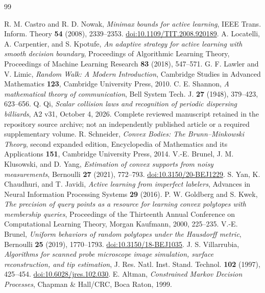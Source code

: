 \begin{thebibliography}{99}
\raggedright
{}
R. M. Castro and R. D. Nowak, \emph{Minimax bounds for active learning},
IEEE Trans. Inform. Theory \textbf{54} (2008), 2339--2353.
\href{https://doi.org/10.1109/TIT.2008.920189}{doi:10.1109/TIT.2008.920189}.
A. Locatelli, A. Carpentier, and S. Kpotufe,
\emph{An adaptive strategy for active learning with smooth decision boundary},
Proceedings of Algorithmic Learning Theory, Proceedings of Machine
Learning Research \textbf{83} (2018), 547--571.
G. F. Lawler and V. Limic, \emph{Random Walk: A Modern Introduction},
Cambridge Studies in Advanced Mathematics \textbf{123}, Cambridge
University Press, 2010.
C. E. Shannon, \emph{A mathematical theory of communication},
Bell System Tech. J. \textbf{27} (1948), 379--423, 623--656.
Q. Qi, \emph{Scalar collision laws and recognition of periodic dispersing
billiards}, A2 v31, October 4, 2026. Complete reviewed manuscript retained in the repository source archive;
not an independently published article or a required supplementary volume.
R. Schneider, \emph{Convex Bodies: The Brunn--Minkowski Theory},
second expanded edition, Encyclopedia of Mathematics and its Applications
\textbf{151}, Cambridge University Press, 2014.
V.-E. Brunel, J. M. Klusowski, and D. Yang,
\emph{Estimation of convex supports from noisy measurements},
Bernoulli \textbf{27} (2021), 772--793.
\href{https://doi.org/10.3150/20-BEJ1229}{doi:10.3150/20-BEJ1229}.
S. Yan, K. Chaudhuri, and T. Javidi,
\emph{Active learning from imperfect labelers},
Advances in Neural Information Processing Systems \textbf{29} (2016).
P. W. Goldberg and S. Kwek,
\emph{The precision of query points as a resource for learning convex
polytopes with membership queries},
Proceedings of the Thirteenth Annual Conference on Computational
Learning Theory, Morgan Kaufmann, 2000, 225--235.
V.-E. Brunel, \emph{Uniform behaviors of random polytopes under the
Hausdorff metric}, Bernoulli \textbf{25} (2019), 1770--1793.
\href{https://doi.org/10.3150/18-BEJ1035}{doi:10.3150/18-BEJ1035}.
J. S. Villarrubia, \emph{Algorithms for scanned probe microscope image
simulation, surface reconstruction, and tip estimation},
J. Res. Natl. Inst. Stand. Technol. \textbf{102} (1997), 425--454.
\href{https://doi.org/10.6028/jres.102.030}{doi:10.6028/jres.102.030}.
E. Altman, \emph{Constrained Markov Decision Processes},
Chapman \& Hall/CRC, Boca Raton, 1999.
\end{thebibliography}
